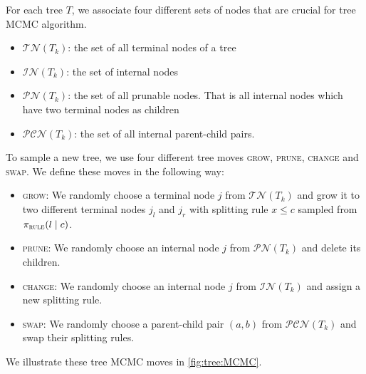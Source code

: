 \documentclass[
12pt]{article}
\begin{document}
	For each tree $T$, we associate four different sets of nodes that are crucial for tree MCMC algorithm. 
	
	\begin{itemize}
		\item $\mathcal{TN}(T_k)$: the set of all terminal nodes of a tree
		\item $\mathcal{IN}(T_k)$: the set of internal nodes
		\item $\mathcal{PN}(T_k)$: the set of all prunable nodes. That is all internal nodes which have two terminal nodes as children
		\item $\mathcal{PCN}(T_k)$: the set of all internal parent-child pairs.
	\end{itemize}
	
	To sample a new tree, we use four different tree moves \textsc{grow}, \textsc{prune}, \textsc{change} and \textsc{swap}. We define these moves in the following way:
	
	\begin{itemize}
		\item \textsc{grow}: We randomly choose a terminal node $j$ from $\mathcal{TN}(T_k)$ and grow it to two different terminal nodes $j_l$ and $j_r$ with splitting rule $x\le c$ sampled from $\pi_{\textsc{rule}}(l\mid c)$. 
		\item \textsc{prune}: We randomly choose an internal node $j$ from $\mathcal{PN}(T_k)$ and delete its children.
		\item \textsc{change}: We randomly choose an internal node $j$ from $\mathcal{IN}(T_k)$ and assign a new splitting rule.
		\item \textsc{swap}: We randomly choose a parent-child pair $(a,b)$ from $\mathcal{PCN}(T_k)$ and swap their splitting rules.
	\end{itemize}
	We illustrate these tree MCMC moves in \cref{fig:tree:MCMC}.
	
\end{document}
